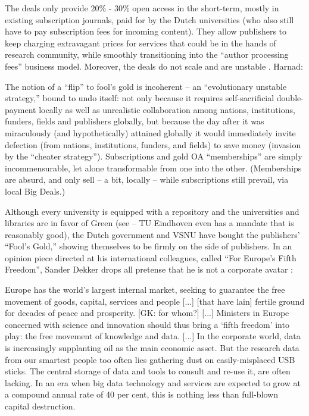 \documentclass[11pt, openany, oneside, article, a4paper, twocolumn]{memoir}
\begin{document}
The deals \cite{uitgeversdeals} only provide 20\% - 30\% open access in the short-term, mostly in
existing subscription journals, paid for by the Dutch universities
(who also still have to pay subscription fees for incoming content). 
They allow publishers to keep charging
extravagant prices for services that could be in the hands of research
community, while smoothly transitioning into the \enquote{author
processing fees} business model.
Moreover, the deals do not scale and are unstable
\cite{harnad2016evolutionary}. Harnad:
\begin{displayquote}
\begin{small}
The notion of a \enquote{flip} to fool's gold is incoherent -- an
\enquote{evolutionary unstable strategy,} bound to undo itself: not only because it
requires self-sacrificial double-payment locally as well as unrealistic
collaboration among nations, institutions, funders, fields and publishers
globally, but because the day after it was miraculously (and hypothetically)
attained globally it would immediately invite defection (from nations,
institutions, funders, and fields) to save money (invasion by the \enquote{cheater
strategy}). Subscriptions and gold OA \enquote{memberships} are simply incommensurable,
let alone transformable from one into the other. (Memberships are absurd, and
only sell -- a bit, locally -- while subscriptions still prevail, via local Big
Deals.)
\end{small}
\end{displayquote}

Although every university is equipped with a repository \cite{narcis} and
the universities and libraries are in favor of Green (see
\cite{openaccessnl} -- TU Eindhoven even has a mandate that is reasonably
good), the Dutch government and VSNU have bought the publishers'
\enquote{Fool's Gold,} showing themselves to be firmly on the side of
publishers. In an opinion piece directed at his international colleagues, called
\enquote{For Europe's Fifth Freedom}, Sander Dekker drops all pretense
that he is not a corporate avatar \cite{dekker_fifth_freedom}:

\begin{displayquote} 
\begin{small}
Europe has the world’s largest internal market, seeking to guarantee the free
movement of goods, capital, services and people [...] [that have lain] fertile ground for
decades of peace and prosperity. [GK: for whom?] [...] Ministers in Europe
concerned with science and innovation should thus bring a \enquote*{fifth
freedom} into play: the free movement of knowledge and data. [...] In the
corporate world, data is increasingly supplanting oil as the main economic
asset. But the research data from our smartest people too often lies gathering
dust on easily-misplaced USB sticks. The central storage of data and tools to
consult and re-use it, are often lacking. In an era when big data technology
and services are expected to grow at a compound annual rate of 40 per cent,
this is nothing less than full-blown capital destruction.
\end{small}
\end{displayquote}
\end{document}
